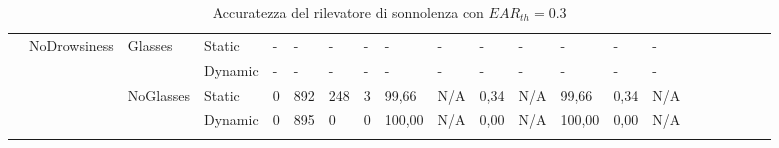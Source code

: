 \documentclass[12pt]{article}
\begin{document}
\begin{landscape}
\begin{table}[]
\begin{adjustbox}{width=1.4\textwidth}
\begin{tabular}{lllllllllllllllccllll}
				\multicolumn{1}{|l|}{} & \multicolumn{1}{l|}{\multirow{4}{*}{NoDrowsiness}} & \multicolumn{1}{l|}{\multirow{2}{*}{Glasses}} & \multicolumn{1}{l|}{Static} & \multicolumn{1}{l|}{-} & \multicolumn{1}{l|}{-} & \multicolumn{1}{l|}{-} & \multicolumn{1}{l|}{-} & \multicolumn{1}{l|}{-} & \multicolumn{1}{l|}{-} & \multicolumn{1}{l|}{-} & \multicolumn{1}{l|}{-} & \multicolumn{1}{l|}{-} & \multicolumn{1}{l|}{-} & \multicolumn{1}{l|}{-} & \multicolumn{1}{c|}{} & \multicolumn{1}{c|}{} & \multicolumn{1}{l|}{} & \multicolumn{1}{l|}{} & \multicolumn{1}{l|}{} & \multicolumn{1}{l|}{} \\ \cline{4-15}
				\multicolumn{1}{|l|}{} & \multicolumn{1}{l|}{} & \multicolumn{1}{l|}{} & \multicolumn{1}{l|}{Dynamic} & \multicolumn{1}{l|}{-} & \multicolumn{1}{l|}{-} & \multicolumn{1}{l|}{-} & \multicolumn{1}{l|}{-} & \multicolumn{1}{l|}{-} & \multicolumn{1}{l|}{-} & \multicolumn{1}{l|}{-} & \multicolumn{1}{l|}{-} & \multicolumn{1}{l|}{-} & \multicolumn{1}{l|}{-} & \multicolumn{1}{l|}{-} & \multicolumn{1}{c|}{} & \multicolumn{1}{c|}{} & \multicolumn{1}{l|}{} & \multicolumn{1}{l|}{} & \multicolumn{1}{l|}{} & \multicolumn{1}{l|}{} \\ \cline{3-15}
				\multicolumn{1}{|l|}{} & \multicolumn{1}{l|}{} & \multicolumn{1}{l|}{\multirow{2}{*}{NoGlasses}} & \multicolumn{1}{l|}{Static}  & \multicolumn{1}{l|}{0} & \multicolumn{1}{l|}{892} & \multicolumn{1}{l|}{248} & \multicolumn{1}{l|}{3} & \multicolumn{1}{l|}{99,66} & \multicolumn{1}{l|}{N/A} & \multicolumn{1}{l|}{0,34} & \multicolumn{1}{l|}{N/A} & \multicolumn{1}{l|}{99,66} & \multicolumn{1}{l|}{0,34} & \multicolumn{1}{l|}{N/A} & \multicolumn{1}{c|}{} & \multicolumn{1}{c|}{} & \multicolumn{1}{l|}{} & \multicolumn{1}{l|}{} & \multicolumn{1}{l|}{} & \multicolumn{1}{l|}{} \\ \cline{4-15}
				\multicolumn{1}{|l|}{} & \multicolumn{1}{l|}{} & \multicolumn{1}{l|}{} & \multicolumn{1}{l|}{Dynamic} & \multicolumn{1}{l|}{0} & \multicolumn{1}{l|}{895} & \multicolumn{1}{l|}{0} & \multicolumn{1}{l|}{0} & \multicolumn{1}{l|}{100,00} & \multicolumn{1}{l|}{N/A} & \multicolumn{1}{l|}{0,00} & \multicolumn{1}{l|}{N/A} & \multicolumn{1}{l|}{100,00} & \multicolumn{1}{l|}{0,00} & \multicolumn{1}{l|}{N/A} & \multicolumn{1}{c|}{} & \multicolumn{1}{c|}{} & \multicolumn{1}{l|}{} & \multicolumn{1}{l|}{} & \multicolumn{1}{l|}{} & \multicolumn{1}{l|}{} \\ \hline
				& & & & & & & & & & & & & & & \multicolumn{1}{l}{} & \multicolumn{1}{l}{} & & & &
			\end{tabular}
		\end{adjustbox}
		\caption{Accuratezza del rilevatore di sonnolenza con $EAR_{th}=0.3$}
		\label{table:test}
	\end{table}
\end{landscape}
\end{document}
